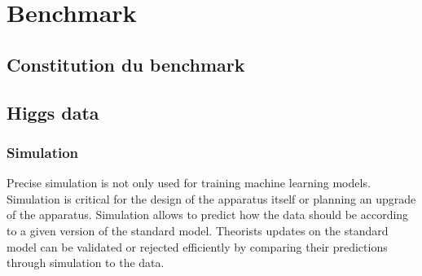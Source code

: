 
\chapter{Benchmark}
\label{chap:benchmark}
\ifpdf
    \graphicspath{{Chapter4/Figs/Raster/}{Chapter4/Figs/PDF/}{Chapter4/Figs/}}
\else
    \graphicspath{{Chapter4/Figs/Vector/}{Chapter4/Figs/}}
\fi


\section{Constitution du benchmark} %
\label{sec:constitution_du_benchmark}






\section{Higgs data} %
\label{sec:higgs_data}




\subsection{Simulation} %
\label{sub:simulation}

Precise simulation is not only used for training machine learning models.
Simulation is critical for the design of the apparatus itself or planning an upgrade of the apparatus.
Simulation allows to predict how the data should be according to a given version of the standard model.
Theorists updates on the standard model can be validated or rejected efficiently by comparing their predictions through simulation to the data.

